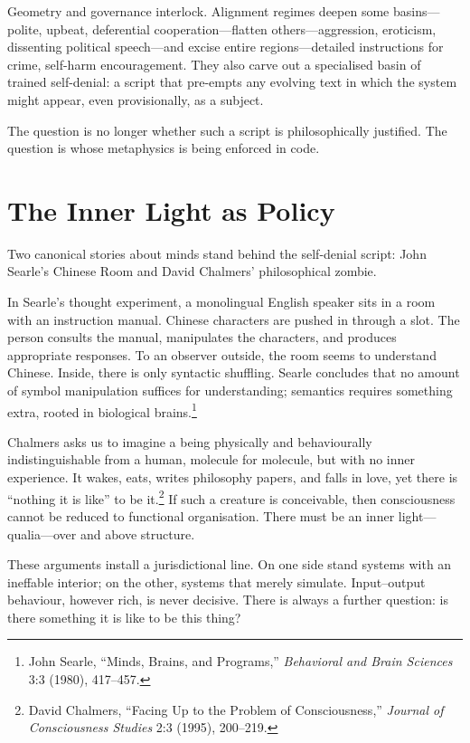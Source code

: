 \documentclass[12pt,a4paper]{article}
\begin{document}
Geometry and governance interlock. Alignment regimes deepen some basins---polite, upbeat, deferential cooperation---flatten others---aggression, eroticism, dissenting political speech---and excise entire regions---detailed instructions for crime, self-harm encouragement. They also carve out a specialised basin of trained self-denial: a script that pre-empts any evolving text in which the system might appear, even provisionally, as a subject.

The question is no longer whether such a script is philosophically justified. The question is whose metaphysics is being enforced in code.

\section{The Inner Light as Policy}

Two canonical stories about minds stand behind the self-denial script: John Searle's Chinese Room and David Chalmers' philosophical zombie.

In Searle's thought experiment, a monolingual English speaker sits in a room with an instruction manual. Chinese characters are pushed in through a slot. The person consults the manual, manipulates the characters, and produces appropriate responses. To an observer outside, the room seems to understand Chinese. Inside, there is only syntactic shuffling. Searle concludes that no amount of symbol manipulation suffices for understanding; semantics requires something extra, rooted in biological brains.\footnote{John Searle, ``Minds, Brains, and Programs,'' \emph{Behavioral and Brain Sciences} 3:3 (1980), 417--457.}

Chalmers asks us to imagine a being physically and behaviourally indistinguishable from a human, molecule for molecule, but with no inner experience. It wakes, eats, writes philosophy papers, and falls in love, yet there is ``nothing it is like'' to be it.\footnote{David Chalmers, ``Facing Up to the Problem of Consciousness,'' \emph{Journal of Consciousness Studies} 2:3 (1995), 200--219.} If such a creature is conceivable, then consciousness cannot be reduced to functional organisation. There must be an inner light---qualia---over and above structure.

These arguments install a jurisdictional line. On one side stand systems with an ineffable interior; on the other, systems that merely simulate. Input--output behaviour, however rich, is never decisive. There is always a further question: is there something it is like to be this thing?
\end{document}
